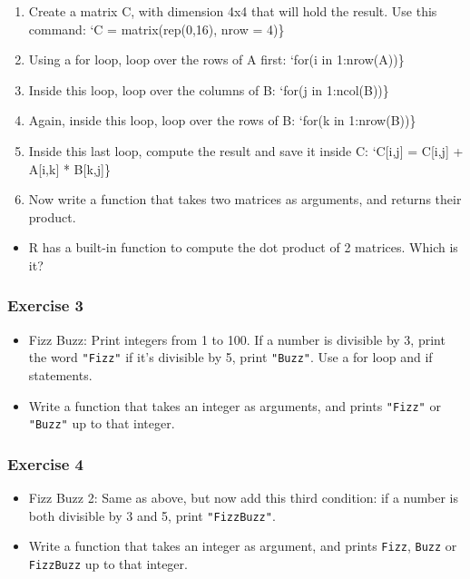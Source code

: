 \documentclass[
]{article}
\providecommand{\tightlist}{%
  \setlength{\itemsep}{0pt}\setlength{\parskip}{0pt}}
\begin{document}
\begin{enumerate}
\def\labelenumi{\arabic{enumi})}
\setcounter{enumi}{2}
\item
  Create a matrix C, with dimension 4x4 that will hold the result. Use this command: `C = matrix(rep(0,16), nrow = 4)\}
\item
  Using a for loop, loop over the rows of A first: `for(i in 1:nrow(A))\}
\item
  Inside this loop, loop over the columns of B: `for(j in 1:ncol(B))\}
\item
  Again, inside this loop, loop over the rows of B: `for(k in 1:nrow(B))\}
\item
  Inside this last loop, compute the result and save it inside C: `C{[}i,j{]} = C{[}i,j{]} + A{[}i,k{]} * B{[}k,j{]}\}
\item
  Now write a function that takes two matrices as arguments, and returns their product.
\end{enumerate}

\begin{itemize}
\tightlist
\item
  R has a built-in function to compute the dot product of 2 matrices. Which is it?
\end{itemize}

\hypertarget{exercise-3-3}{%
\subsubsection*{Exercise 3}\label{exercise-3-3}}

\begin{itemize}
\item
  Fizz Buzz: Print integers from 1 to 100. If a number is divisible by 3, print the word \texttt{"Fizz"} if
  it's divisible by 5, print \texttt{"Buzz"}. Use a for loop and if statements.
\item
  Write a function that takes an integer as arguments, and prints \texttt{"Fizz"} or \texttt{"Buzz"} up to that integer.
\end{itemize}

\hypertarget{exercise-4-2}{%
\subsubsection*{Exercise 4}\label{exercise-4-2}}

\begin{itemize}
\item
  Fizz Buzz 2: Same as above, but now add this third condition: if a number is both divisible by 3 and 5, print \texttt{"FizzBuzz"}.
\item
  Write a function that takes an integer as argument, and prints \texttt{Fizz}, \texttt{Buzz} or \texttt{FizzBuzz} up to that integer.
\end{itemize}
\end{document}
